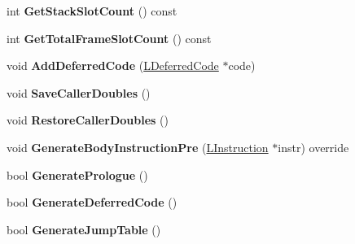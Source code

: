 \begin{DoxyCompactItemize}
\item 
int {\bfseries Get\+Stack\+Slot\+Count} () const \hypertarget{classv8_1_1internal_1_1_l_code_gen_ae997141e779eee569145e6d5f4326745}{}\label{classv8_1_1internal_1_1_l_code_gen_ae997141e779eee569145e6d5f4326745}

\item 
int {\bfseries Get\+Total\+Frame\+Slot\+Count} () const \hypertarget{classv8_1_1internal_1_1_l_code_gen_a7e0a34008896a2d4d09dab6f216df9cc}{}\label{classv8_1_1internal_1_1_l_code_gen_a7e0a34008896a2d4d09dab6f216df9cc}

\item 
void {\bfseries Add\+Deferred\+Code} (\hyperlink{classv8_1_1internal_1_1_l_deferred_code}{L\+Deferred\+Code} $\ast$code)\hypertarget{classv8_1_1internal_1_1_l_code_gen_a136807d3acd05ca71821c19ab49ef581}{}\label{classv8_1_1internal_1_1_l_code_gen_a136807d3acd05ca71821c19ab49ef581}

\item 
void {\bfseries Save\+Caller\+Doubles} ()\hypertarget{classv8_1_1internal_1_1_l_code_gen_a668f6d1f7c5aaf43fbfce22898808064}{}\label{classv8_1_1internal_1_1_l_code_gen_a668f6d1f7c5aaf43fbfce22898808064}

\item 
void {\bfseries Restore\+Caller\+Doubles} ()\hypertarget{classv8_1_1internal_1_1_l_code_gen_a094ae8da5b8b7b7d12990d25a4db2272}{}\label{classv8_1_1internal_1_1_l_code_gen_a094ae8da5b8b7b7d12990d25a4db2272}

\item 
void {\bfseries Generate\+Body\+Instruction\+Pre} (\hyperlink{classv8_1_1internal_1_1_l_instruction}{L\+Instruction} $\ast$instr) override\hypertarget{classv8_1_1internal_1_1_l_code_gen_a85d4251ce8010cd6b04358d6f54e1d13}{}\label{classv8_1_1internal_1_1_l_code_gen_a85d4251ce8010cd6b04358d6f54e1d13}

\item 
bool {\bfseries Generate\+Prologue} ()\hypertarget{classv8_1_1internal_1_1_l_code_gen_aff05496f75e5706dc01028ef21cd2065}{}\label{classv8_1_1internal_1_1_l_code_gen_aff05496f75e5706dc01028ef21cd2065}

\item 
bool {\bfseries Generate\+Deferred\+Code} ()\hypertarget{classv8_1_1internal_1_1_l_code_gen_a7edbe3129e1ff758f4c3d471d6038aee}{}\label{classv8_1_1internal_1_1_l_code_gen_a7edbe3129e1ff758f4c3d471d6038aee}

\item 
bool {\bfseries Generate\+Jump\+Table} ()\hypertarget{classv8_1_1internal_1_1_l_code_gen_af066f353885f2f3cec35f74445989328}{}\label{classv8_1_1internal_1_1_l_code_gen_af066f353885f2f3cec35f74445989328}


\end{DoxyCompactItemize}
